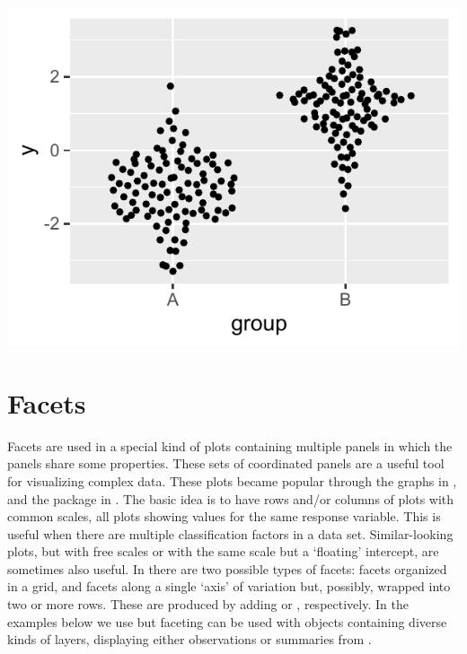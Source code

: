 \documentclass[krantz2]{krantz}\usepackage{knitr}
\begin{document}
\begin{knitrout}\footnotesize
{}\color{fgcolor}\begin{kframe}
\begin{alltt}
  \hlopt{+}
  \hlstd{()}
\end{alltt}
\end{kframe}

{\centering \includegraphics[width=.54\textwidth]{figure/pos-ggbeeswarm-plot-01-1}

}



\end{knitrout}


\section{Facets}\label{sec:plot:facets}
Facets are used in a special kind of plots containing multiple panels in which the panels share some properties.
These sets of coordinated panels are a useful tool for visualizing complex data. These plots became popular through the  graphs in , and the  package in \Rlang. The basic idea is to have rows and/or columns of plots with common scales, all plots showing values for the same response variable. This is useful when there are multiple classification factors in a data set. Similar-looking plots, but with free scales or with the same scale but a `floating' intercept, are sometimes also useful. In \ggplot there are two possible types of facets: facets organized in a grid, and facets along a single `axis' of variation but, possibly, wrapped into two or more rows. These are produced by adding  or , respectively. In the examples below we use  but faceting can be used with  objects containing diverse kinds of layers, displaying either observations or summaries from .
\end{document}

